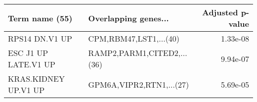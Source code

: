 \begin{tabular}{llr}
\toprule
      Term name (55) &       Overlapping genes... &  Adjusted p-value \\
\midrule
      RPS14 DN.V1 UP &     CPM,RBM47,LST1,...(40) &          1.33e-08 \\
ESC J1 UP LATE.V1 UP & RAMP2,PARM1,CITED2,...(36) &          9.94e-07 \\
KRAS.KIDNEY UP.V1 UP &   GPM6A,VIPR2,RTN1,...(27) &          5.69e-05 \\
\bottomrule
\end{tabular}
